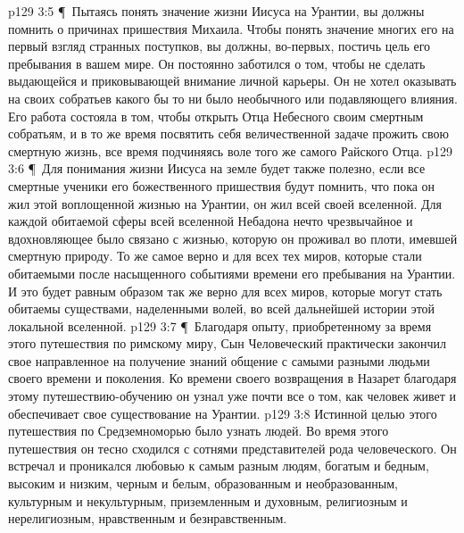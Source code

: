 \vs p129 3:5 \P\ Пытаясь понять значение жизни Иисуса на Урантии, вы должны помнить о причинах пришествия Михаила. Чтобы понять значение многих его на первый взгляд странных поступков, вы должны, во\hyp{}первых, постичь цель его пребывания в вашем мире. Он постоянно заботился о том, чтобы не сделать выдающейся и приковывающей внимание личной карьеры. Он не хотел оказывать на своих собратьев какого бы то ни было необычного или подавляющего влияния. Его работа состояла в том, чтобы открыть Отца Небесного своим смертным собратьям, и в то же время посвятить себя величественной задаче прожить свою смертную жизнь, все время подчиняясь воле того же самого Райского Отца.
\vs p129 3:6 \P\ Для понимания жизни Иисуса на земле будет также полезно, если все смертные ученики его божественного пришествия будут помнить, что пока он жил этой воплощенной жизнью на Урантии, он жил  всей своей вселенной. Для каждой обитаемой сферы всей вселенной Небадона нечто чрезвычайное и вдохновляющее было связано с жизнью, которую он проживал во плоти, имевшей смертную природу. То же самое верно и для всех тех миров, которые стали обитаемыми после насыщенного событиями времени его пребывания на Урантии. И это будет равным образом так же верно для всех миров, которые могут стать обитаемы существами, наделенными волей, во всей дальнейшей истории этой локальной вселенной.
\vs p129 3:7 \P\ Благодаря опыту, приобретенному за время этого путешествия по римскому миру, Сын Человеческий практически закончил свое направленное на получение знаний общение с самыми разными людьми своего времени и поколения. Ко времени своего возвращения в Назарет благодаря этому путешествию\hyp{}обучению он узнал уже почти все о том, как человек живет и обеспечивает свое существование на Урантии.
\vs p129 3:8 Истинной целью этого путешествия по Средземноморью было узнать людей. Во время этого путешествия он тесно сходился с сотнями представителей рода человеческого. Он встречал и проникался любовью к самым разным людям, богатым и бедным, высоким и низким, черным и белым, образованным и необразованным, культурным и некультурным, приземленным и духовным, религиозным и нерелигиозным, нравственным и безнравственным.
